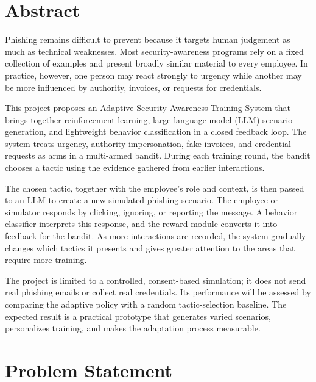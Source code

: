 \documentclass[12pt,a4paper]{article}
\begin{document}

\section{Abstract}

Phishing remains difficult to prevent because it targets human
judgement as much as technical weaknesses. Most security-awareness
programs rely on a fixed collection of examples and present broadly
similar material to every employee. In practice, however, one person
may react strongly to urgency while another may be more influenced by
authority, invoices, or requests for credentials.

This project proposes an Adaptive Security Awareness Training System
that brings together reinforcement learning, large language model
(LLM) scenario generation, and lightweight behavior classification in
a closed feedback loop. The system treats urgency, authority
impersonation, fake invoices, and credential requests as arms in a
multi-armed bandit. During each training round, the bandit chooses a
tactic using the evidence gathered from earlier interactions.

The chosen tactic, together with the employee's role and context, is
then passed to an LLM to create a new simulated phishing scenario. The
employee or simulator responds by clicking, ignoring, or reporting the
message. A behavior classifier interprets this response, and the reward
module converts it into feedback for the bandit. As more interactions
are recorded, the system gradually changes which tactics it presents
and gives greater attention to the areas that require more training.

The project is limited to a controlled, consent-based simulation; it
does not send real phishing emails or collect real credentials. Its
performance will be assessed by comparing the adaptive policy with a
random tactic-selection baseline. The expected result is a practical
prototype that generates varied scenarios, personalizes training, and
makes the adaptation process measurable.



\section{Problem Statement}
\end{document}
